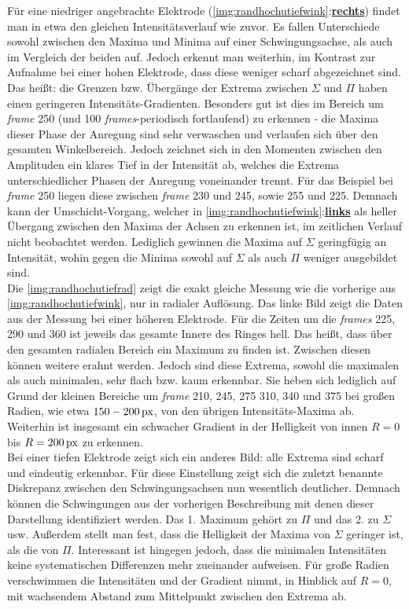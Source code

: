 \documentclass[numbers=noenddot,a4paper,notitlepage,twoside,BCOR15mm]{scrbook}
\newcommand{\tilt}[1]{\textit{#1}}
\newcommand{\fett}[1]{\textbf{#1}}
\begin{document}
			Für eine niedriger angebrachte Elektrode (\ref{img:randhochutiefwink}:\underline{\fett{rechts}}) findet man in etwa den gleichen Intensitätsverlauf wie zuvor. Es fallen Unterschiede sowohl zwischen den Maxima und Minima auf einer Schwingungsachse, als auch im Vergleich der beiden auf. Jedoch erkennt man weiterhin, im Kontrast zur Aufnahme bei einer hohen Elektrode, dass diese weniger scharf abgezeichnet sind. Das heißt: die Grenzen bzw. Übergänge der Extrema zwischen $\Sigma$ und $\Pi$ haben einen geringeren Intensitäts-Gradienten. Besonders gut ist dies im Bereich um \tilt{frame} 250 (und 100 \tilt{frames}-periodisch fortlaufend) zu erkennen - die Maxima dieser Phase der Anregung sind sehr verwaschen und verlaufen sich über den gesamten Winkelbereich. Jedoch zeichnet sich in den Momenten zwischen den Amplituden ein klares Tief in der Intensität ab, welches die Extrema unterschiedlicher Phasen der Anregung voneinander trennt. Für das Beispiel bei  \tilt{frame} 250 liegen diese zwischen \tilt{frame} 230 und 245, sowie 255 und 225. Demnach kann der Umschicht-Vorgang, welcher in \ref{img:randhochutiefwink}:\underline{\fett{links}} als heller Übergang zwischen den Maxima der Achsen zu erkennen ist, im zeitlichen Verlauf nicht beobachtet werden. Lediglich gewinnen die Maxima auf $\Sigma$ geringfügig an Intensität, wohin gegen die Minima sowohl auf $\Sigma$ als auch $\Pi$ weniger ausgebildet sind.\\
			Die \ref{img:randhochutiefrad} zeigt die exakt gleiche Messung wie die vorherige aus \ref{img:randhochutiefwink}, nur in radialer Auflösung. Das linke Bild zeigt die Daten aus der Messung bei einer höheren Elektrode. Für die Zeiten um die \tilt{frames} 225, 290 und 360 ist jeweils das gesamte Innere des Ringes hell. Das heißt, dass über den gesamten radialen Bereich ein Maximum zu finden ist. Zwischen diesen können weitere erahnt werden. Jedoch sind diese Extrema, sowohl die maximalen als auch minimalen, sehr flach bzw. kaum erkennbar. Sie heben sich lediglich auf Grund der kleinen Bereiche um \tilt{frame} 210, 245, 275 310, 340 und 375 bei großen Radien, wie etwa $\unit[150-200]{px}$, von den übrigen Intensitäts-Maxima ab. Weiterhin ist insgesamt ein schwacher Gradient in der Helligkeit von innen $R=0$ bis $R=\unit[200]{px}$ zu erkennen.\\
			Bei einer tiefen Elektrode zeigt sich ein anderes Bild: alle Extrema sind scharf und eindeutig erkennbar. Für diese Einstellung zeigt sich die zuletzt benannte Diskrepanz zwischen den Schwingungsachsen nun wesentlich deutlicher. Demnach können die Schwingungen aus der vorherigen Beschreibung mit denen dieser Darstellung identifiziert werden. Das 1. Maximum gehört zu $\Pi$ und das 2. zu $\Sigma$ usw. Außerdem stellt man fest, dass die Helligkeit der Maxima von $\Sigma$ geringer ist, als die von $\Pi$. Interessant ist hingegen jedoch, dass die minimalen Intensitäten keine systematischen Differenzen mehr zueinander aufweisen. Für große Radien verschwimmen die Intensitäten und der Gradient nimmt, in Hinblick auf $R=0$, mit wachsendem Abstand zum Mittelpunkt zwischen den Extrema ab.
\end{document}
